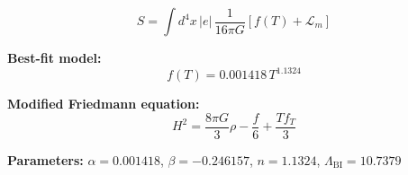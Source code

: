 
\begin{equation}
  S = \int d^4x \, |e| \, \frac{1}{16\pi G} \left[ f(T) + \mathcal{L}_m \right]
\end{equation}

\textbf{Best-fit model:}
\begin{equation}
  f(T) = 0.001418 \, T^{1.1324}
\end{equation}

\textbf{Modified Friedmann equation:}
\begin{equation}
  H^2 = \frac{8\pi G}{3} \rho - \frac{f}{6} + \frac{T f_T}{3}
\end{equation}

\textbf{Parameters:}
$\alpha = 0.001418$, \quad
$\beta = -0.246157$, \quad
$n = 1.1324$, \quad
$\Lambda_{\text{BI}} = 10.7379$